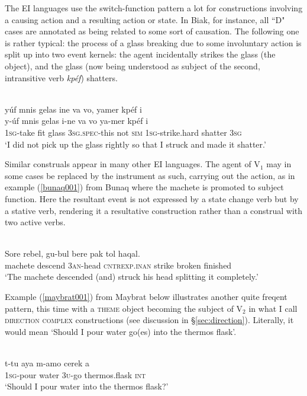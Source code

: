 The EI languages use the switch-function pattern a lot for constructions involving a causing action and a resulting action or state. In Biak, for instance, all ``D" cases are annotated as being related to some sort of causation. The following one is rather typical: the process of a glass breaking due to some involuntary action is split up into two event kernels: the agent incidentally strikes the glass (the object), and the glass (now being understood as subject of the second, intransitive verb \textit{kpéf}) shatters.

\ea 
{}\\
\glll yúf mnis gelas ine va vo, yamer kpéf i \\
y-úf mnis gelas i-ne va vo ya-mer kpéf i \\
1\textsc{sg}-take fit glass 3\textsc{sg}.\textsc{spec}-this not \textsc{sim} 1\textsc{sg}-strike.hard shatter 3\textsc{sg} \\
\glft `I did not pick up the glass rightly so that I struck and made it shatter.'\\ 
\z

Similar construals appear in many other EI languages. The agent of V$_1$ may in some cases be replaced by the instrument as such, carrying out the action, as in example (\ref{bunaq001}) from Bunaq where the machete is promoted to subject function. Here the resultant event is not expressed by a state change verb but by a stative verb, rendering it a resultative construction rather than a construal with two active verbs.

\ea \label{bunaq001}
\\
\gll Sore rebel, gu-bul bere pak tol haqal. \\
machete descend 3\textsc{an}-head \textsc{cntrexp}.\textsc{inan} strike broken finished \\
\glft `The machete descended (and) struck his head splitting it completely.’\\ 
\z

Example (\ref{maybrat001}) from Maybrat below illustrates another quite freqent pattern, this time with a \textsc{theme} object becoming the subject of V$_2$ in what I call \textsc{direction complex} constructions (see discussion in §\ref{sec:direction}). Literally, it would mean `Should I pour water go(es) into the thermos flask'.

\ea \label{maybrat001}
\\
\gll t-tu aya m-amo cerek a \\
1\textsc{sg}-pour water 3\textsc{u}-go thermos.flask \textsc{int} \\
\glft `Should I pour water into the thermos flask?'\\ 
\z

